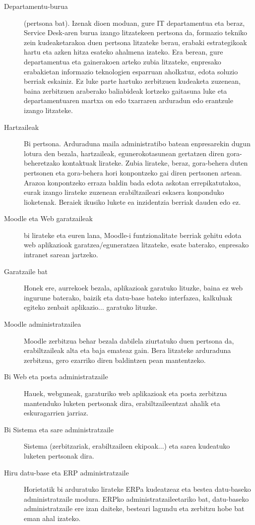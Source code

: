 \begin{description}
 \item [Departamentu-burua] (pertsona bat). Izenak dioen moduan, gure IT departamentua eta beraz, Service Desk-aren burua izango litzatekeen pertsona da, formazio tekniko zein kudeaketarakoa duen pertsona litzateke berau, erabaki estrategikoak hartu eta azken hitza esateko ahalmena izateko. Era berean, gure departamentua eta gainerakoen arteko zubia litzateke, enpresako erabakietan informazio teknologien esparruan aholkatuz, edota soluzio berriak eskainiz. Ez luke parte hartuko zerbitzuen kudeaketa zuzenean, baina zerbitzuen araberako baliabideak lortzeko gaitasuna luke eta departamentuaren martxa on edo txarraren arduradun edo erantzule izango litzateke.

 \item [Hartzaileak] Bi pertsona. Arduraduna maila administratibo batean enpresarekin dugun lotura den bezala, hartzaileak, egunerokotasunean gertatzen diren gora-beheretzako kontaktuak lirateke. Zubia lirateke, beraz, gora-behera duten pertsonen eta gora-behera hori konpontzeko gai diren pertsonen artean. Arazoa konpontzeko erraza baldin bada edota askotan errepikatutakoa, eurak izango lirateke zuzenean erabiltzaileari eskaera konponduko lioketenak. Beraiek ikusiko lukete ea inzidentzia berriak dauden edo ez.

\item [Moodle eta Web garatzaileak] bi lirateke eta euren lana, Moodle-i funtzionalitate berriak gehitu edota web aplikazioak garatzea/eguneratzea litzateke, esate baterako, enpresako intranet sarean jartzeko.

\item [Garatzaile bat] Honek ere, aurrekoek bezala, aplikazioak garatuko lituzke, baina ez web ingurune baterako, baizik eta datu-base bateko interfazea, kalkuluak egiteko zenbait aplikazio... garatuko lituzke.

\item [Moodle administratzailea] Moodle zerbitzua behar bezala dabilela ziurtatuko duen pertsona da, erabiltzaileak alta eta baja emateaz gain. Bera litzateke arduraduna zerbitzua, gero ezarriko diren baldintzen pean mantentzeko.  

\item [Bi Web eta posta administratzaile] Hauek, webguneak, garaturiko web aplikazioak eta posta zerbitzua mantenduko luketen pertsonak dira, erabiltzaileentzat ahalik eta eskuragarrien jarriaz.

\item [Bi Sistema eta sare administratzaile] Sistema (zerbitzariak, erabiltzaileen ekipoak...) eta sarea kudeatuko luketen pertsonak dira.

\item [Hiru datu-base eta ERP administratzaile] Horietatik bi arduratuko lirateke ERPa kudeatzeaz eta bestea datu-baseko administratzaile modura. ERPko administratzaileetariko bat, datu-baseko administratzaile ere izan daiteke, besteari lagundu eta zerbitzu hobe bat eman ahal izateko.
\end{description}


